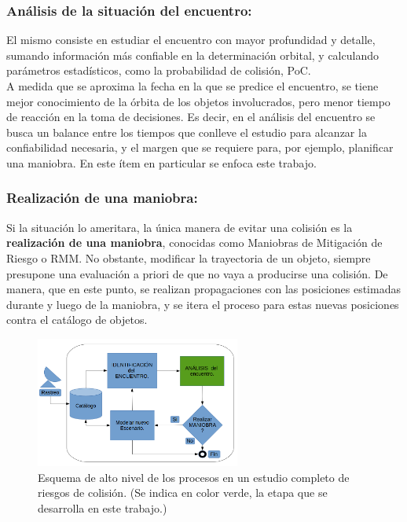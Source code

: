 \subsubsection*{An\'alisis de la situaci\'on del encuentro: }
El mismo consiste en estudiar el encuentro con mayor profundidad y detalle, sumando informaci\'on m\'as confiable en la determinaci\'on orbital, y calculando par\'ametros estad\'isticos, como la probabilidad de colisi\'on, \ac{PoC}.\\

A medida que se aproxima la fecha en la que se predice el encuentro, se tiene mejor conocimiento de la \'orbita de los objetos involucrados, pero menor tiempo de reacci\'on en la toma de decisiones. Es decir, en el an\'alisis del encuentro se busca un balance entre los tiempos que conlleve el estudio para alcanzar la confiabilidad necesaria, y el margen que se requiere para, por ejemplo, planificar una maniobra. En este \'item en particular se enfoca este trabajo.\\

\subsubsection*{Realizaci\'on de una maniobra:}
Si la situaci\'on lo ameritara, la \'unica manera de evitar una colisi\'on es la {\bf{realizaci\'on de una maniobra}}, conocidas como Maniobras de Mitigaci\'on de Riesgo o \ac{RMM}. No obstante, modificar la trayectoria de un objeto, siempre presupone una evaluaci\'on a priori de que no vaya a producirse una colisi\'on. De manera, que en este punto, se realizan propagaciones con las posiciones estimadas durante y luego de la maniobra, y se itera el proceso para estas nuevas posiciones contra el cat\'alogo de objetos.\\ 



\begin{figure}[!h]
  \centering
  \includegraphics[width=0.6\textwidth]{imagenes/estudiocolision}
  \caption[Estudio de Colisi\'on]{Esquema de alto nivel de los procesos en un estudio completo de riesgos de colisi\'on. (Se indica en color verde, la etapa que se desarrolla en este trabajo.)}
  \label{fig:estudiocolision}
\end{figure}


